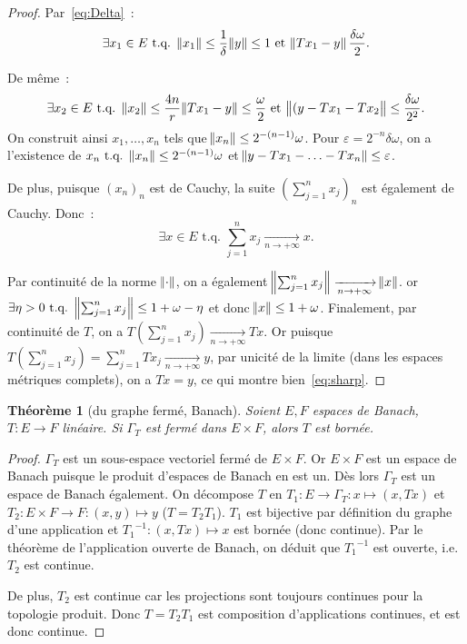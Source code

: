 \documentclass{report}
\newcommand{\tq}{\text{ t.q. }}
\newcommand{\st}{\tq}
\newcommand{\pinfty}{{+\infty}}
\newtheorem{thm}{Théorème}[chapter]
\theoremstyle{definition}
\theoremstyle{remark}
\begin{document}
\begin{proof}
Par~\eqref{eq:Delta}~:
\[\exists x_1 \in E \st \norm {x_1} \leq \frac 1\delta\norm y \leq 1 \text{ et } \norm {Tx_1-y} \frac {\delta\omega}2.\]

De même~:
\[\exists x_2 \in E \st \norm {x_2} \leq \frac {4n}r\norm {Tx_1 - y} \leq \frac \omega2 \text{ et } \norm {(y-Tx_1 - Tx_2} \leq \frac {\delta\omega}{2^2}.\]
On construit ainsi $x_1, \ldots, x_n$ tels que $\norm {x_n} \leq 2^{-(n-1)}\omega$. Pour $\varepsilon = 2^{-n}\delta\omega$, on a l'existence de
$x_n \st \norm {x_n} \leq 2^{-(n-1)}\omega$ et $\norm {y-Tx_1-\ldots-Tx_n} \leq \varepsilon$.

De plus, puisque $(x_n)_n$ est de Cauchy, la suite $(\sum_{j=1}^nx_j)_n$ est également de Cauchy. Donc~:
\[\exists x \in E \st \sum_{j=1}^nx_j \xrightarrow[n \to \pinfty]{} x.\]

Par continuité de la norme $\norm \cdot$, on a également $\norm {\sum_{j=1}^nx_j} \xrightarrow[n \to \pinfty]{} \norm x$. or
$\exists \eta > 0 \st \norm {\sum_{j=1}^nx_j} \leq 1+\omega-\eta$ et donc $\norm x \leq 1+\omega$. Finalement, par continuité de $T$, on a
$T(\sum_{j=1}^nx_j) \xrightarrow[n \to \pinfty]{} Tx$. Or puisque $T(\sum_{j=1}^nx_j) = \sum_{j=1}^nTx_j \xrightarrow[n \to \pinfty]{} y$, par unicité de la limite
(dans les espaces métriques complets), on a $Tx=y$,
ce qui montre bien~\eqref{eq:sharp}.
\end{proof}

\begin{thm}[du graphe fermé, Banach]\label{thm:graphe fermé} Soient $E, F$ espaces de Banach, $T : E \to F$ linéaire. Si $\Gamma_T$ est fermé dans $E \times F$, alors $T$ est bornée.
\end{thm}

\begin{proof} $\Gamma_T$ est un sous-espace vectoriel fermé de $E \times F$. Or $E \times F$ est un espace de Banach puisque le produit d'espaces de Banach en est un.
Dès lors $\Gamma_T$ est un espace de Banach également. On décompose $T$ en $T_1 : E \to \Gamma_T : x \mapsto (x, Tx)$ et $T_2 : E \times F \to F : (x, y) \mapsto y$ ($T = T_2T_1$).
$T_1$ est bijective par définition du graphe d'une application et ${T_1}^{-1} : (x, Tx) \mapsto x$ est bornée (donc continue). Par le théorème de l'application ouverte de Banach,
on déduit que ${T_1}^{-1}$ est ouverte, i.e. $T_2$ est continue.

De plus, $T_2$ est continue car les projections sont toujours continues pour la topologie produit. Donc $T = T_2T_1$ est composition d'applications continues, et est donc continue.
\end{proof}
\end{document}
